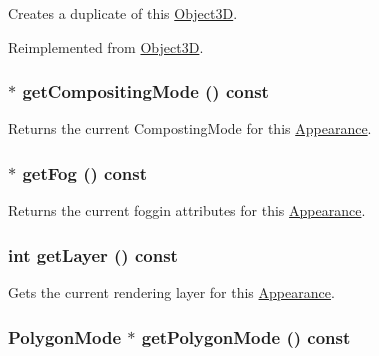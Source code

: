 Creates a duplicate of this \hyperlink{classm3g_1_1Object3D}{Object3D}. 

Reimplemented from \hyperlink{classm3g_1_1Object3D_a25110dac934f867b83b73ad4741a0f4}{Object3D}.\hypertarget{classm3g_1_1Appearance_e4045934febb56891c15e14486b239a8}{
\subsubsection[{getCompositingMode}]{ $\ast$ getCompositingMode () const}}
\label{classm3g_1_1Appearance_e4045934febb56891c15e14486b239a8}


Returns the current CompostingMode for this \hyperlink{classm3g_1_1Appearance}{Appearance}. \hypertarget{classm3g_1_1Appearance_93143a921b998ff69576147a59eb44d4}{
\subsubsection[{getFog}]{ $\ast$ getFog () const}}
\label{classm3g_1_1Appearance_93143a921b998ff69576147a59eb44d4}


Returns the current foggin attributes for this \hyperlink{classm3g_1_1Appearance}{Appearance}. \hypertarget{classm3g_1_1Appearance_df831e0e0ebf9d7e997150e497e6a6cf}{
\subsubsection[{getLayer}]{\setlength{\rightskip}{0pt plus 5cm}int getLayer () const}}
\label{classm3g_1_1Appearance_df831e0e0ebf9d7e997150e497e6a6cf}


Gets the current rendering layer for this \hyperlink{classm3g_1_1Appearance}{Appearance}. \hypertarget{classm3g_1_1Appearance_dd3ddcefcd18339150d281b155602886}{
\subsubsection[{getPolygonMode}]{\setlength{\rightskip}{0pt plus 5cm}PolygonMode $\ast$ getPolygonMode () const}}
\label{classm3g_1_1Appearance_dd3ddcefcd18339150d281b155602886}


